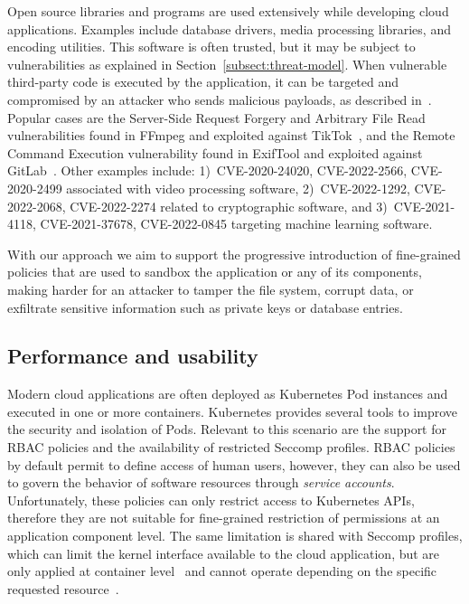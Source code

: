Open source libraries and programs are used extensively while
developing cloud applications. Examples include database drivers,
media processing libraries, and encoding utilities.  This software is
often trusted, but it may be subject to vulnerabilities as explained
in Section~\ref{subsect:threat-model}.  When vulnerable third-party
code is executed by the application, it can be targeted and
compromised by an attacker who sends malicious payloads, as described
in~\cite{sanddriller-staicu, cage4deno, npm-malicious-update}.
Popular cases are the Server-Side Request Forgery and Arbitrary File
Read vulnerabilities found in FFmpeg and exploited against
TikTok~\cite{ffmpeg-exploit-example}, and the Remote Command Execution
vulnerability found in ExifTool and exploited against
GitLab~\cite{exiftool-exploit-example}. Other examples include:
1)~CVE-2020-24020, CVE-2022-2566, CVE-2020-2499 associated with video
processing software, 2)~CVE-2022-1292, CVE-2022-2068, CVE-2022-2274
related to cryptographic software, and 3)~CVE-2021-4118,
CVE-2021-37678, CVE-2022-0845 targeting machine learning software.

With our approach we aim to support the progressive introduction of
fine-grained policies that are used to sandbox the application or any
of its components, making harder for an attacker to tamper the file
system, corrupt data, or exfiltrate sensitive information such as
private keys or database entries.

\subsection{Performance and usability}

Modern cloud applications are often deployed as Kubernetes Pod
instances and executed in one or more containers. Kubernetes provides
several tools to improve the security and isolation of Pods. Relevant
to this scenario are the support for RBAC policies and the
availability of restricted Seccomp profiles. RBAC policies by default
permit to define access of human users, however, they can also be used
to govern the behavior of software resources through {\em service
  accounts}. Unfortunately, these policies can only restrict access to
Kubernetes APIs, therefore they are not suitable for fine-grained
restriction of permissions at an application component level. The same
limitation is shared with Seccomp profiles, which can limit the kernel
interface available to the cloud application, but are only applied at
container level~\cite{k8s-seccomp} and cannot operate depending on the
specific requested resource~\cite{jia2023programmable}.

